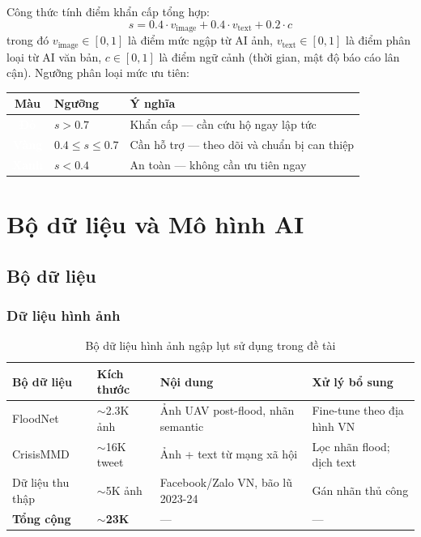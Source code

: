 \documentclass[12pt, a4paper]{report}
\begin{document}
Công thức tính điểm khẩn cấp tổng hợp:
\begin{equation}
  s = 0.4 \cdot v_{\text{image}} + 0.4 \cdot v_{\text{text}} + 0.2 \cdot c
  \label{eq:urgency}
\end{equation}
trong đó $v_{\text{image}} \in [0,1]$ là điểm mức ngập từ AI ảnh, $v_{\text{text}} \in [0,1]$ là điểm phân loại từ AI văn bản, $c \in [0,1]$ là điểm ngữ cảnh (thời gian, mật độ báo cáo lân cận). Ngưỡng phân loại mức ưu tiên:

\begin{center}
\begin{tabular}{clp{6cm}}
\toprule
\textbf{Màu} & \textbf{Ngưỡng} & \textbf{Ý nghĩa} \\
\midrule
\cellcolor{urgentred}\textcolor{white}{\textbf{Đỏ}}
  & $s > 0.7$ & Khẩn cấp — cần cứu hộ ngay lập tức \\
\cellcolor{warnyellow}\textcolor{white}{\textbf{Vàng}}
  & $0.4 \leq s \leq 0.7$ & Cần hỗ trợ — theo dõi và chuẩn bị can thiệp \\
\cellcolor{safegreen}\textcolor{white}{\textbf{Xanh}}
  & $s < 0.4$ & An toàn — không cần ưu tiên ngay \\
\bottomrule
\end{tabular}
\end{center}

\chapter{Bộ dữ liệu và Mô hình AI}

\section{Bộ dữ liệu}

\subsection{Dữ liệu hình ảnh}

\begin{table}[H]
\centering
\caption{Bộ dữ liệu hình ảnh ngập lụt sử dụng trong đề tài}
\label{tab:image-datasets}
\begin{tabular}{llp{4.5cm}p{3.5cm}}
\toprule
\textbf{Bộ dữ liệu} & \textbf{Kích thước} & \textbf{Nội dung} & \textbf{Xử lý bổ sung} \\
\midrule
FloodNet \cite{rahnemoonfar2021floodnet}
  & $\sim$2.3K ảnh & Ảnh UAV post-flood, nhãn semantic & Fine-tune theo địa hình VN \\
CrisisMMD \cite{alam2018crisismmd}
  & $\sim$16K tweet & Ảnh + text từ mạng xã hội & Lọc nhãn flood; dịch text \\
Dữ liệu thu thập
  & $\sim$5K ảnh & Facebook/Zalo VN, bão lũ 2023-24 & Gán nhãn thủ công \\
\midrule
\textbf{Tổng cộng} & \textbf{$\sim$23K} & — & — \\
\bottomrule
\end{tabular}
\end{table}
\end{document}
